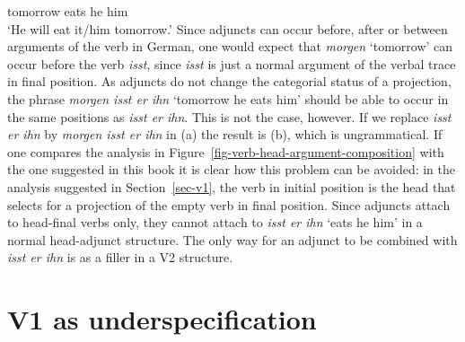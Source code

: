 \begin{exe}
\begin{xlist}
	 tomorrow \spacebr{}eats \spacebr{}he \spacebr{}him\\
\glt `He will eat it/him tomorrow.'
\z
Since adjuncts can occur before, after or between arguments of the verb in German, one would expect that \emph{morgen} `tomorrow' can occur before the verb
\emph{isst}, since \emph{isst} is just a normal argument of the verbal trace in final position. As adjuncts do not change the categorial status of a projection, the phrase \emph{morgen isst er ihn} `tomorrow he eats him' should be able to
occur in the same positions as \emph{isst er ihn}. This is not the case, however. If we replace
\emph{isst er ihn} by \emph{morgen isst er ihn} in (a) the result is (b), which is ungrammatical.
\eal
{}
\zl
If one compares the analysis in Figure~\ref{fig-verb-head-argument-composition} with the one
suggested in this book it is clear how this problem can be avoided: in the analysis suggested in Section~\ref{sec-v1},
the verb in initial position is the head that selects for a projection of the empty verb in final
position. Since adjuncts attach to head-final verbs only, they cannot attach to \emph{isst er ihn}
`eats he him' in a normal head-adjunct structure. The only way for an adjunct to be combined with
\emph{isst er ihn} is as a filler in a V2 structure.


\section{V1 as underspecification}


\end{xlist}
\end{exe}
